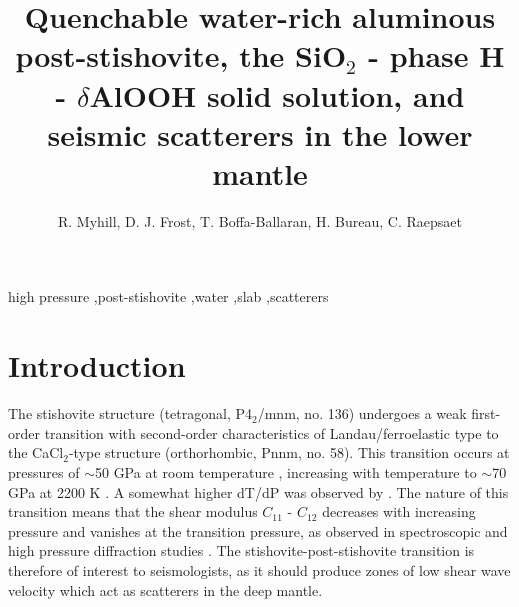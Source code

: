 \documentclass[review]{elsarticle}
\begin{document}
\begin{frontmatter}

\title{Quenchable water-rich aluminous post-stishovite, the SiO$_2$ - phase H - $\delta$AlOOH solid solution, and seismic scatterers in the lower mantle}

\author{R. Myhill, D. J. Frost, T. Boffa-Ballaran, H. Bureau, C. Raepsaet}
\address{Bayerisches Geoinstitut, Universit\"{a}t Bayreuth, Universit\"{a}tsstrasse 30, 95447 Bayreuth, Germany}

\begin{abstract}

\end{abstract}

\begin{keyword}
high pressure \sep post-stishovite \sep water \sep slab \sep scatterers
\end{keyword}

\end{frontmatter}

\linenumbers

\section{Introduction}

The stishovite structure (tetragonal, P4$_2$/mnm, no. 136) undergoes a weak first-order transition \citep{AFGH1998, HSCHMK2000} with second-order characteristics of Landau/ferroelastic type \citep{TY1989, CHM2000} to the CaCl$_2$-type structure (orthorhombic, Pnnm, no. 58). This transition occurs at pressures of $\sim$50 GPa at room temperature \citep{KCHM1995, AFGH1998}, increasing with temperature to $\sim$70 GPa at 2200 K \citep{HTSO2005,Nomuraetal2010}. A somewhat higher dT/dP was observed by \cite{OHMI2002}. The nature of this transition means that the shear modulus $C_{11}$ - $C_{12}$ decreases with increasing pressure and vanishes at the transition pressure, as observed in spectroscopic and high pressure diffraction studies \citep{KCHM1995, SDL2002}. The stishovite-post-stishovite transition is therefore of interest to seismologists, as it should produce zones of low shear wave velocity which act as scatterers in the deep mantle.
\end{document}
